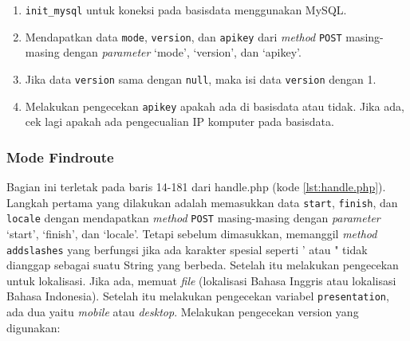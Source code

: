 \begin{enumerate}
\begin{itemize}
	\end{itemize}
	\item \verb!init_mysql! untuk koneksi pada basisdata menggunakan MySQL. 
	\item Mendapatkan data \verb!mode!, \verb!version!, dan \verb!apikey! dari \textit{method} \verb!POST! masing-masing dengan \textit{parameter} `mode', `version', dan `apikey'.
	\item Jika data \verb!version! sama dengan  \verb!null!, maka isi data \verb!version! dengan 1. 
	\item Melakukan pengecekan \verb!apikey! apakah ada di basisdata atau tidak. Jika ada, cek lagi apakah ada pengecualian IP komputer pada basisdata.
\end{enumerate}

\subsubsection{Mode Findroute}
Bagian ini terletak pada baris 14-181 dari handle.php (kode \ref{lst:handle.php}). Langkah pertama yang dilakukan adalah memasukkan data \verb!start!, \verb!finish!, dan \verb!locale! dengan mendapatkan \textit{method} \verb!POST! masing-masing dengan \textit{parameter} `start', `finish', dan `locale'. Tetapi sebelum dimasukkan, memanggil \textit{method} \verb!addslashes! yang berfungsi jika ada karakter spesial seperti ' atau " tidak dianggap sebagai suatu String yang berbeda. Setelah itu melakukan pengecekan untuk lokalisasi. Jika ada, memuat \textit{file} (lokalisasi Bahasa Inggris atau lokalisasi Bahasa Indonesia). Setelah itu melakukan pengecekan variabel \verb!presentation!, ada dua yaitu \textit{mobile} atau \textit{desktop}. Melakukan pengecekan version yang digunakan:

